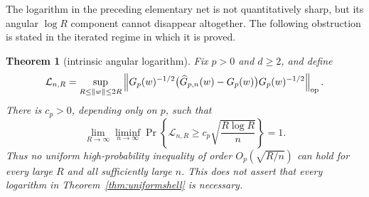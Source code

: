 \documentclass[11pt]{article}
\newtheorem{theorem}{Theorem}[section]
\begin{document}
The logarithm in the preceding elementary net is not quantitatively sharp, but its angular $\log R$ component
cannot disappear altogether.  The following obstruction is stated in the iterated regime in which it is proved.

\begin{theorem}[intrinsic angular logarithm]
\label{thm:intrinsicangularlog}
Fix $p>0$ and $d\ge2$, and define
\[
 \mathcal L_{n,R}=\sup_{R\le\lVert w\rVert\le2R}
 \left\|G_p(w)^{-1/2}\bigl(\widehat G_{p,n}(w)-G_p(w)\bigr)
 G_p(w)^{-1/2}\right\|_{\rm op}.
\]
There is $c_p>0$, depending only on $p$, such that
\begin{equation}
 \lim_{R\to\infty}\liminf_{n\to\infty}
 \Pr\left\{\mathcal L_{n,R}\ge c_p\sqrt{\frac{R\log R}{n}}\right\}=1.
 \label{eq:intrinsicangularlog}
\end{equation}
Thus no uniform high-probability inequality of order $O_p(\sqrt{R/n})$ can hold for every large $R$ and all
sufficiently large $n$.  This does not assert that every logarithm in Theorem~\ref{thm:uniformshell} is necessary.
\end{theorem}
\end{document}

